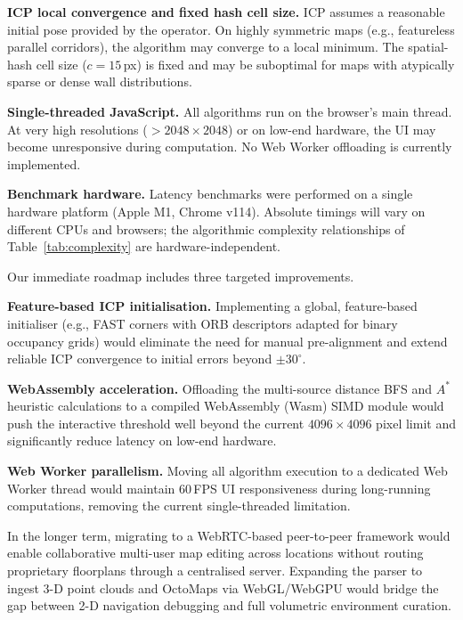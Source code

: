 \documentclass[journal]{IEEEtran}
\begin{document}
\textbf{ICP local convergence and fixed hash cell size.}  ICP assumes a
reasonable initial pose provided by the operator.  On highly symmetric maps
(e.g., featureless parallel corridors), the algorithm may converge to a local
minimum.  The spatial-hash cell size ($c=15$\,px) is fixed and may be
suboptimal for maps with atypically sparse or dense wall distributions.

\textbf{Single-threaded JavaScript.}  All algorithms run on the browser's main
thread.  At very high resolutions ($>\!2048\times2048$) or on low-end hardware,
the UI may become unresponsive during computation.  No Web Worker offloading
is currently implemented.

\textbf{Benchmark hardware.}  Latency benchmarks were performed on a single
hardware platform (Apple M1, Chrome v114).  Absolute timings will vary on
different CPUs and browsers; the algorithmic complexity relationships of
Table~\ref{tab:complexity} are hardware-independent.



Our immediate roadmap includes three targeted improvements.

\textbf{Feature-based ICP initialisation.}  Implementing a global,
feature-based initialiser (e.g., FAST corners with ORB descriptors adapted for
binary occupancy grids) would eliminate the need for manual pre-alignment and
extend reliable ICP convergence to initial errors beyond $\pm30^{\circ}$.

\textbf{WebAssembly acceleration.}  Offloading the multi-source distance BFS
and $A^{*}$ heuristic calculations to a compiled WebAssembly (Wasm) SIMD
module would push the interactive threshold well beyond the current
$4096\times4096$ pixel limit and significantly reduce latency on low-end
hardware.

\textbf{Web Worker parallelism.}  Moving all algorithm execution to a
dedicated Web Worker thread would maintain 60\,FPS UI responsiveness during
long-running computations, removing the current single-threaded limitation.

In the longer term, migrating to a WebRTC-based peer-to-peer framework would
enable collaborative multi-user map editing across locations without routing
proprietary floorplans through a centralised server.  Expanding the parser to
ingest 3-D point clouds and OctoMaps via WebGL/WebGPU would bridge the gap
between 2-D navigation debugging and full volumetric environment curation.
\end{document}
